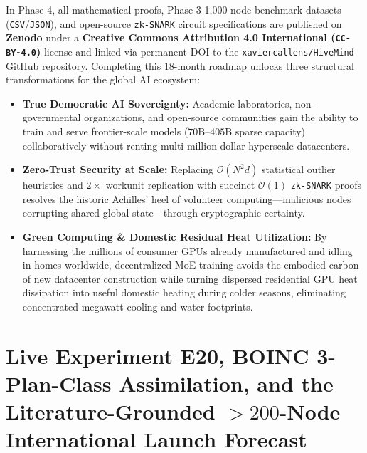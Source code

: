\documentclass[11pt,a4paper]{article}
\begin{document}
In Phase 4, all mathematical proofs, Phase 3 1{,}000-node benchmark datasets (\texttt{CSV}/\texttt{JSON}), and open-source \texttt{zk-SNARK} circuit specifications are published on \textbf{Zenodo} under a \textbf{Creative Commons Attribution 4.0 International (\texttt{CC-BY-4.0})} license and linked via permanent DOI to the \texttt{xaviercallens/HiveMind} GitHub repository. Completing this 18-month roadmap unlocks three structural transformations for the global AI ecosystem:
\begin{itemize}[leftmargin=1.8em]
    \item \textbf{True Democratic AI Sovereignty:} Academic laboratories, non-governmental organizations, and open-source communities gain the ability to train and serve frontier-scale models ($70\text{B}\text{--}405\text{B}$ sparse capacity) collaboratively without renting multi-million-dollar hyperscale datacenters.
    \item \textbf{Zero-Trust Security at Scale:} Replacing $\mathcal{O}(N^2 d)$ statistical outlier heuristics and $2\times$ workunit replication with succinct $\mathcal{O}(1)$ \texttt{zk-SNARK} proofs resolves the historic Achilles' heel of volunteer computing---malicious nodes corrupting shared global state---through cryptographic certainty.
    \item \textbf{Green Computing \& Domestic Residual Heat Utilization:} By harnessing the millions of consumer GPUs already manufactured and idling in homes worldwide, decentralized MoE training avoids the embodied carbon of new datacenter construction while turning dispersed residential GPU heat dissipation into useful domestic heating during colder seasons, eliminating concentrated megawatt cooling and water footprints.
\end{itemize}

\section{Live Experiment E20, BOINC 3-Plan-Class Assimilation, and the Literature-Grounded $>200$-Node International Launch Forecast}
\label{sec:international_launch_forecast}
\end{document}
